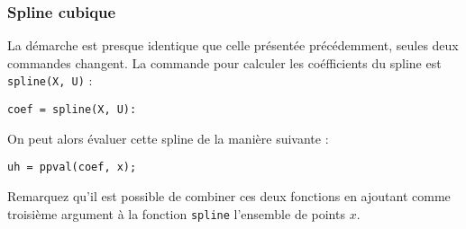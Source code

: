 \subsubsection{Spline cubique}
La démarche est presque identique que celle présentée précédemment, seules deux 
commandes changent. La commande pour calculer les coéfficients du spline
est \lstinline{spline(X, U)} :

\begin{lstlisting}
coef = spline(X, U):
\end{lstlisting}

On peut alors évaluer cette spline de la manière suivante :

\begin{lstlisting}
uh = ppval(coef, x); 
\end{lstlisting}

Remarquez qu'il est possible de combiner ces deux fonctions en ajoutant comme
troisième argument à la fonction \lstinline{spline} l'ensemble de points $x$.

